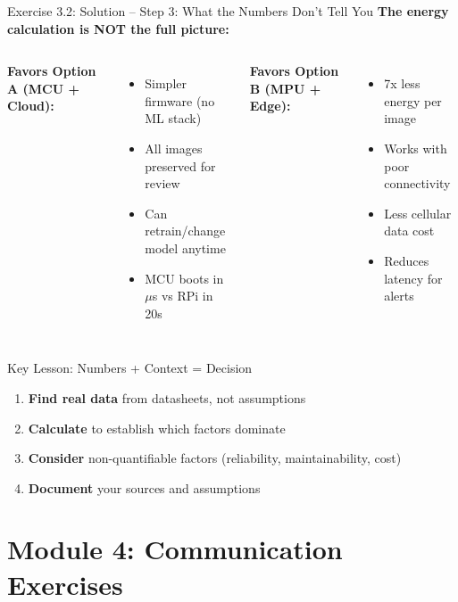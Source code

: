 \documentclass[aspectratio=169,11pt]{beamer}
\begin{document}
\begin{frame}{Exercise 3.2: Solution -- Step 3: What the Numbers Don't Tell You}
    \textbf{The energy calculation is NOT the full picture:}
    
    \begin{columns}
        \textbf{Favors Option A (MCU + Cloud):}
        \begin{itemize}
            \item Simpler firmware (no ML stack)
            \item All images preserved for review
            \item Can retrain/change model anytime
            \item MCU boots in $\mu$s vs RPi in 20s
        \end{itemize}
        
        \textbf{Favors Option B (MPU + Edge):}
        \begin{itemize}
            \item 7x less energy per image
            \item Works with poor connectivity
            \item Less cellular data cost
            \item Reduces latency for alerts
        \end{itemize}
    \end{columns}
    
    \vspace{0.4cm}
    \begin{block}{Key Lesson: Numbers + Context = Decision}
        \begin{enumerate}
            \item \textbf{Find real data} from datasheets, not assumptions
            \item \textbf{Calculate} to establish which factors dominate
            \item \textbf{Consider} non-quantifiable factors (reliability, maintainability, cost)
            \item \textbf{Document} your sources and assumptions
        \end{enumerate}
    \end{block}
\end{frame}

\section{Module 4: Communication Exercises}
\end{document}
